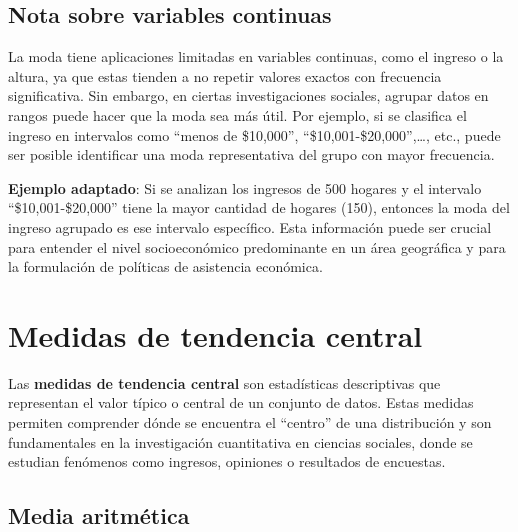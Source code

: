\documentclass[
  letterpaper,
  DIV=11,
  numbers=noendperiod]{scrreprt}
\begin{document}
\subsection{Nota sobre variables
continuas}\label{nota-sobre-variables-continuas}

La moda tiene aplicaciones limitadas en variables continuas, como el
ingreso o la altura, ya que estas tienden a no repetir valores exactos
con frecuencia significativa. Sin embargo, en ciertas investigaciones
sociales, agrupar datos en rangos puede hacer que la moda sea más útil.
Por ejemplo, si se clasifica el ingreso en intervalos como ``menos de
\$10,000'', ``\$10,001-\$20,000'',\ldots, etc., puede ser posible
identificar una moda representativa del grupo con mayor frecuencia.

\begin{tcolorbox}[enhanced jigsaw, toprule=.15mm, opacitybacktitle=0.6, toptitle=1mm, arc=.35mm, left=2mm, title=\textcolor{quarto-callout-tip-color}{\faLightbulb}\hspace{0.5em}{Tip}, titlerule=0mm, leftrule=.75mm, rightrule=.15mm, coltitle=black, bottomtitle=1mm, bottomrule=.15mm, colframe=quarto-callout-tip-color-frame, opacityback=0, colback=white, breakable, colbacktitle=quarto-callout-tip-color!10!white]

\textbf{Ejemplo adaptado}: Si se analizan los ingresos de 500 hogares y
el intervalo ``\$10,001-\$20,000'' tiene la mayor cantidad de hogares
(150), entonces la moda del ingreso agrupado es ese intervalo
específico. Esta información puede ser crucial para entender el nivel
socioeconómico predominante en un área geográfica y para la formulación
de políticas de asistencia económica.

\end{tcolorbox}

\section{Medidas de tendencia
central}\label{medidas-de-tendencia-central}

Las \textbf{medidas de tendencia central} son estadísticas descriptivas
que representan el valor típico o central de un conjunto de datos. Estas
medidas permiten comprender dónde se encuentra el ``centro'' de una
distribución y son fundamentales en la investigación cuantitativa en
ciencias sociales, donde se estudian fenómenos como ingresos, opiniones
o resultados de encuestas.

\subsection{Media aritmética}\label{media-aritmuxe9tica}
\end{document}
